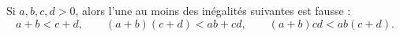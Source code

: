 Si $a, b, c, d > 0$, alors l'une au moins des inégalités suivantes est fausse :
\[ a + b < c + d,\qquad (a + b)(c + d) < ab + cd,\qquad (a + b)cd < ab(c + d). \]
